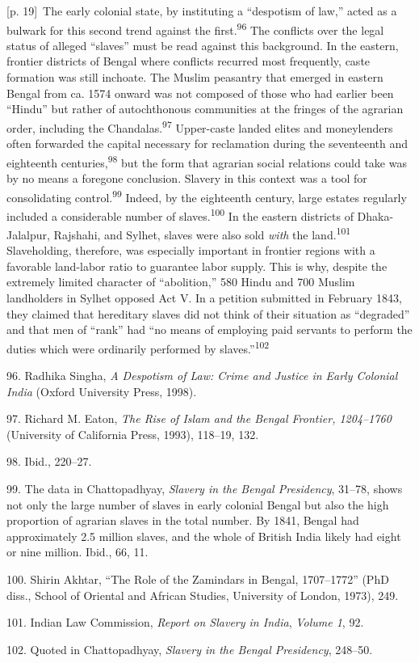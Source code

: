 \documentclass[10pt,a4paper]{article}
\begin{document}
{\scriptsize\color{gray} [p. 19]}\ The early colonial state, by instituting a “despotism of law,” acted as a bulwark for this second trend against the first.\nobreak\textsuperscript{96} The conflicts over the legal status of alleged “slaves” must be read against this background. In the eastern, frontier districts of Bengal where conflicts recurred most frequently, caste formation was still inchoate. The Muslim peasantry that emerged in eastern Bengal from ca. 1574 onward was not composed of those who had earlier been “Hindu” but rather of autochthonous communities at the fringes of the agrarian order, including the Chandalas.\nobreak\textsuperscript{97} Upper-caste landed elites and moneylenders often forwarded the capital necessary for reclamation during the seventeenth and eighteenth centuries,\nobreak\textsuperscript{98} but the form that agrarian social relations could take was by no means a foregone conclusion. Slavery in this context was a tool for consolidating control.\nobreak\textsuperscript{99} Indeed, by the eighteenth century, large estates regularly included a considerable number of slaves.\nobreak\textsuperscript{100} In the eastern districts of Dhaka-Jalalpur, Rajshahi, and Sylhet, slaves were also sold \textit{with} the land.\nobreak\textsuperscript{101} Slaveholding, therefore, was especially important in frontier regions with a favorable land-labor ratio to guarantee labor supply. This is why, despite the extremely limited character of “abolition,” 580 Hindu and 700 Muslim landholders in Sylhet opposed Act V. In a petition submitted in February 1843, they claimed that hereditary slaves did not think of their situation as “degraded” and that men of “rank” had “no means of employing paid servants to perform the duties which were ordinarily performed by slaves.”\nobreak\textsuperscript{102}\par{\small 96. Radhika Singha, \textit{A Despotism of Law: Crime and Justice in Early Colonial India} (Oxford University Press, 1998).\par}{\small 97. Richard M. Eaton, \textit{The Rise of Islam and the Bengal Frontier, 1204–1760} (University of California Press, 1993), 118–19, 132.\par}{\small 98. Ibid., 220–27.\par}{\small 99. The data in Chattopadhyay, \textit{Slavery in the Bengal Presidency}, 31–78, shows not only the large number of slaves in early colonial Bengal but also the high proportion of agrarian slaves in the total number. By 1841, Bengal had approximately 2.5 million slaves, and the whole of British India likely had eight or nine million. Ibid., 66, 11.\par}{\small 100. Shirin Akhtar, “The Role of the Zamindars in Bengal, 1707–1772” (PhD diss., School of Oriental and African Studies, University of London, 1973), 249.\par}{\small 101. Indian Law Commission, \textit{Report on Slavery in India}, \textit{Volume 1}, 92.\par}{\small 102. Quoted in Chattopadhyay, \textit{Slavery in the Bengal Presidency}, 248–50.\par}
\end{document}
